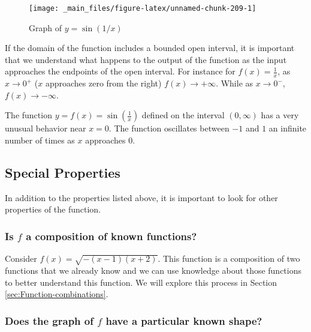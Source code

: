 \documentclass[
]{book}
\theoremstyle{definition}
\theoremstyle{definition}
\theoremstyle{definition}
\theoremstyle{remark}
\begin{document}
\begin{figure}

{\centering \texttt{[image: \_main\_files/figure-latex/unnamed-chunk-209-1]} 

}

\caption{Graph of $y=\sin(1/x)$}\label{fig:unnamed-chunk-209}
\end{figure}

If the domain of the function includes a bounded open interval, it is important that we understand what happens to the output of the function as the input approaches the endpoints of the open interval. For instance for \(f(x)=\frac{1}{x}\), as \(x\rightarrow 0^+\) (\(x\) approaches zero from the right) \(f(x)\rightarrow +\infty\). While as \(x\rightarrow 0^-\), \(f(x)\rightarrow -\infty\).

The function \(y=f(x)=\sin\left(\frac{1}{x}\right)\) defined on the interval \((0,\infty)\) has a very unusual behavior near \(x=0\). The function oscillates between \(-1\) and \(1\) an infinite number of times as \(x\) approaches \(0\).

\hypertarget{special-properties}{%
\subsection{Special Properties}\label{special-properties}}

In addition to the properties listed above, it is important to look for other properties of the function.

\hypertarget{is-f-a-composition-of-known-functions}{%
\subsubsection*{\texorpdfstring{Is \(f\) a composition of known functions?}{Is f a composition of known functions?}}\label{is-f-a-composition-of-known-functions}}

Consider \(f(x)=\sqrt{-(x-1)(x+2)}\). This function is a composition of two functions that we already know and we can use knowledge about those functions to better understand this function. We will explore this process in Section \ref{sec:Function-combinations}.

\hypertarget{does-the-graph-of-f-have-a-particular-known-shape}{%
\subsubsection*{\texorpdfstring{Does the graph of \(f\) have a particular known shape?}{Does the graph of f have a particular known shape?}}\label{does-the-graph-of-f-have-a-particular-known-shape}}
\end{document}
